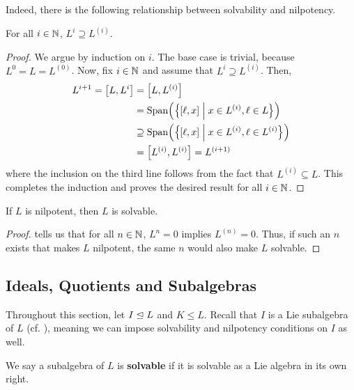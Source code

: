 Indeed, there is the following relationship between solvability and nilpotency.

\begin{lemma}\label{Ch1:Lemma:DerivedSeriesContainedInLowerCentralSeries}
    For all $i \in \mathbb{N}$, $L^i \supseteq L^{(i)}$.
\end{lemma}
\begin{proof}
    We argue by induction on $i$. The base case is trivial, because $L^0 = L = L^{(0)}$. Now, fix $i \in \mathbb{N}$ and assume that $L^i \supseteq L^{(i)}$. Then,
    \begin{align*}
        L^{i + 1}
        = \left[ L, L^i \right] &= \left[ L, L^{(i)} \right] \\
        &= \operatorname{Span}\!\left( \left\{ \left[ \ell, x \right] \; \middle\vert \; x \in L^{(i)}, \ell \in L \right\} \right) \\
        &\supseteq \operatorname{Span}\!\left( \left\{ \left[ \ell, x \right] \; \middle\vert \; x \in L^{(i)}, \ell \in L^{(i)} \right\} \right) \\
        &= \left[ L^{(i)}, L^{(i)} \right] = L^{(i + 1)}
    \end{align*}
    where the inclusion on the third line follows from the fact that $L^{(i)} \subseteq L$. This completes the induction and proves the desired result for all $i \in \mathbb{N}$.
\end{proof}

\begin{boxcorollary}
    If $L$ is nilpotent, then $L$ is solvable.
\end{boxcorollary}
\begin{proof}
     tells us that for all $n \in \mathbb{N}$, $L^n = 0$ implies $L^{(n)} = 0$. Thus, if such an $n$ exists that makes $L$ nilpotent, the same $n$ would also make $L$ solvable.
\end{proof}

\subsection{Ideals, Quotients and Subalgebras}

Throughout this section, let $I \trianglelefteq L$ and $K \leq L$. Recall that $I$ is a Lie subalgebra of $L$ (cf. ), meaning we can impose solvability and nilpotency conditions on $I$ as well.

\begin{definition}
    We say a subalgebra of $L$ is \textbf{solvable} if it is solvable as a Lie algebra in its own right.
\end{definition}

